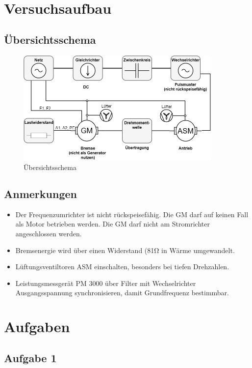 \documentclass[a4paper,11pt,oneside]{book}
\begin{document}
\clearpage

\chapter{Versuchsaufbau}
\section{Übersichtsschema}
\begin{figure}[h]
	\includegraphics[width=0.9\textwidth]{images/Versuchsaufbau.jpg}
	\caption{Übersichtsschema}
	\label{fig:uebersichtsschema}
\end{figure}
\section{Anmerkungen}
\begin{itemize}
\item Der Frequenzumrichter ist nicht rückspeisefähig. Die GM darf auf keinen Fall als Motor betrieben werden. Die GM darf nicht am Stromrichter angeschlossen werden.
\item Bremsenergie wird über einen Widerstand (81\si{\ohm}  in Wärme  umgewandelt.
\item Lüftungsventiltoren ASM einschalten, besonders bei tiefen Drehzahlen.
\item Leistungsmessgerät PM 3000 über Filter mit Wechselrichter Ausgangsspannung synchronisieren, damit Grundfrequenz bestimmbar.
\end{itemize}

\chapter{Aufgaben}
\minitoc
\minilof
\minilot
\section{Aufgabe 1}
\end{document}
